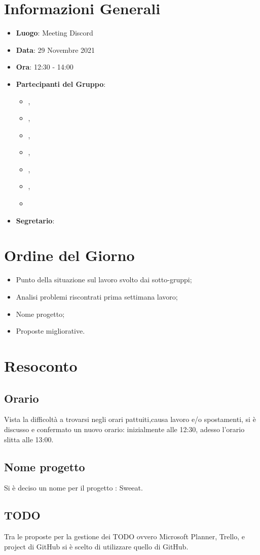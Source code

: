 \section{Informazioni Generali}

\begin{itemize}
\item{\textbf{Luogo}}: Meeting Discord
\item{\textbf{Data}}: 29 Novembre 2021
\item{\textbf{Ora}}: 12:30 - 14:00
\item{\textbf{Partecipanti del Gruppo}}: 
	\begin{itemize}
	\item{\EP{},} 
	\item{\FP{},}
	\item{\GC{},}
	\item{\LW{},}
	\item{\MB{},}
	\item{\MG{},}
	\item{\PV{}}
	\end{itemize} 
\item{\textbf{Segretario}}: \PV{}	
\end{itemize}

\section{Ordine del Giorno}
\begin{itemize}
\item{Punto della situazione sul lavoro svolto dai sotto-gruppi;}
\item{Analisi problemi riscontrati prima settimana lavoro;}
\item{Nome progetto;}
\item{Proposte migliorative.}
\end{itemize}

\section{Resoconto}

\subsection{Orario}
Vista la difficoltà a trovarsi negli orari pattuiti,causa lavoro e/o spostamenti, si è discusso e confermato un nuovo orario: inizialmente alle 12:30, adesso l'orario slitta alle 13:00.


\subsection{Nome progetto}
Si è deciso un nome per il progetto : Sweeat.


\subsection{TODO}
Tra le proposte per la gestione dei TODO ovvero Microsoft Planner, Trello, e project di GitHub si è scelto di utilizzare quello di GitHub.